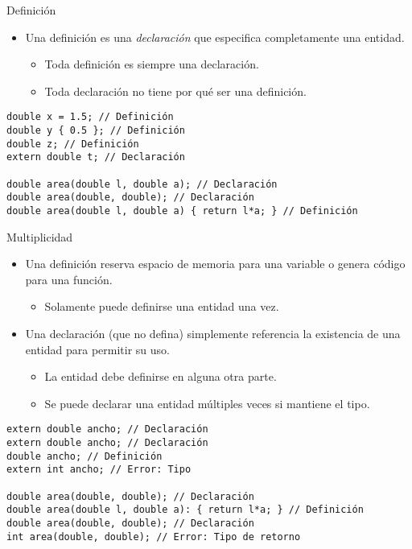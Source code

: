 \begin{frame}[fragile]{Definición}
  \begin{itemize}
    \item Una \alert{definición} es una \emph{declaración} que especifica completamente una entidad.
      \begin{itemize}
        \item Toda definición es siempre una declaración.
        \item Toda declaración no tiene por qué ser una definición.
      \end{itemize}
  \end{itemize}
\begin{lstlisting}
double x = 1.5; // Definición
double y { 0.5 }; // Definición
double z; // Definición
extern double t; // Declaración

double area(double l, double a); // Declaración
double area(double, double); // Declaración
double area(double l, double a) { return l*a; } // Definición
\end{lstlisting}
\end{frame}

\begin{frame}[fragile]{Multiplicidad}
\begin{itemize}
  \item Una \alert{definición} reserva espacio de memoria para una variable o genera código
        para una función.
    \begin{itemize}
      \item Solamente puede definirse una entidad una vez.
    \end{itemize}
  \item Una \alert{declaración} (que no defina) simplemente referencia la existencia de una entidad
        para permitir su uso.
    \begin{itemize}
      \item La entidad debe definirse en alguna otra parte.
      \item Se puede declarar una entidad múltiples veces si mantiene el tipo.
    \end{itemize}
\end{itemize}
\begin{lstlisting}
extern double ancho; // Declaración
extern double ancho; // Declaración
double ancho; // Definición
extern int ancho; // Error: Tipo

double area(double, double); // Declaración
double area(double l, double a): { return l*a; } // Definición
double area(double, double); // Declaración
int area(double, double); // Error: Tipo de retorno
\end{lstlisting}
\end{frame}


